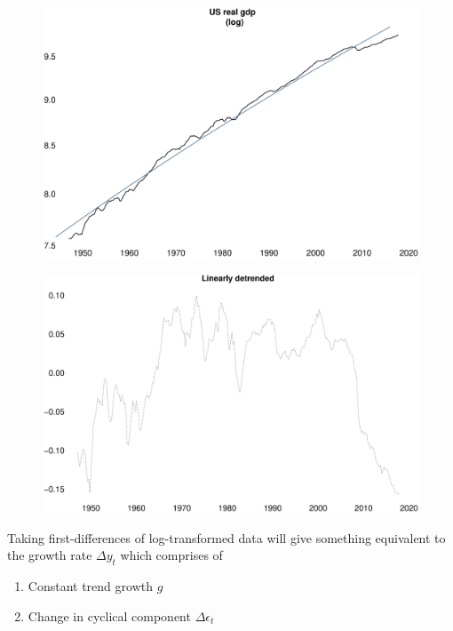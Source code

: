 \documentclass{beamer}
\begin{document}
\begin{frame}
  \begin{figure}
    \includegraphics[scale=.25]{log_linear.eps}
  \end{figure}
\end{frame}

\begin{frame}
  \begin{figure}
    \includegraphics[scale=.25]{loglin_errors.eps}
  \end{figure}
\end{frame}

\begin{frame}
  Taking first-differences of log-transformed data will give something equivalent to the growth rate $\Delta y_t$ which comprises of
  \begin{enumerate}
    \item Constant trend growth $g$
    \item Change in cyclical component $\Delta \epsilon_t$
  \end{enumerate}
\end{frame}
\end{document}
